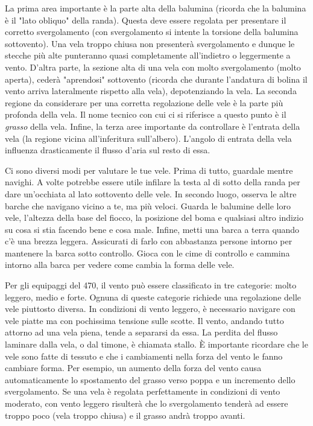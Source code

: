 La prima area importante è la parte alta della balumina (ricorda che la balumina
è il "lato obliquo" della randa). Questa deve essere
regolata per presentare il corretto svergolamento (con svergolamento si intente
la torsione della balumina sottovento). Una vela
troppo chiusa non presenterà svergolamento e dunque le stecche più alte punteranno quasi
completamente all'indietro o leggermente a vento. D'altra parte, la sezione alta di una vela con
molto svergolamento (molto aperta), cederà "aprendosi" sottovento (ricorda che
durante l'andatura di bolina il vento arriva lateralmente rispetto alla vela),
depotenziando la vela.
%
La seconda regione da considerare per una corretta regolazione delle vele è la
parte più profonda della vela. Il nome tecnico con cui ci si riferisce a questo
punto è il \emph{grasso} della vela.
%
Infine, la terza aree importante da controllare è l'entrata della vela (la
regione vicina all'inferitura sull'albero). L'angolo di entrata della vela
influenza drasticamente il flusso d'aria sul resto di essa.

Ci sono diversi modi per valutare le tue vele. Prima di tutto, guardale
mentre navighi. A volte potrebbe essere utile infilare la testa al di sotto della randa
per dare un'occhiata al lato sottovento delle vele. In secondo luogo, osserva le
altre barche che navigano vicino a te, ma più veloci. Guarda le balumine delle
loro vele, l'altezza della base del fiocco, la posizione del boma
e qualsiasi altro indizio su cosa si stia facendo bene e cosa male. Infine,
metti una barca a terra quando c'è una brezza leggera. Assicurati di farlo con
abbastanza persone intorno per mantenere la barca sotto controllo. Gioca con le
cime di controllo e cammina intorno alla barca per vedere come cambia la forma
delle vele.

Per gli equipaggi del 470, il vento può essere classificato in tre categorie:
molto leggero, medio e forte. Ognuna di queste categorie richiede una
regolazione delle vele piuttosto diversa. In condizioni di vento leggero, è
necessario navigare con vele piatte ma con pochissima tensione sulle scotte. Il
vento, andando tutto attorno ad una vela piena, tende a separarsi da essa. La
perdita del flusso laminare dalla vela, o dal timone, è chiamata stallo. È
importante ricordare che le vele sono fatte di tessuto e che i cambiamenti nella
forza del vento le fanno cambiare forma. Per esempio, un aumento della forza del
vento causa automaticamente lo spostamento del grasso verso poppa e un
incremento dello svergolamento. Se una vela è regolata perfettamente in
condizioni di vento moderato, con vento leggero risulterà che lo
svergolamento tenderà ad essere troppo poco (vela troppo chiusa) e il grasso andrà troppo avanti.
